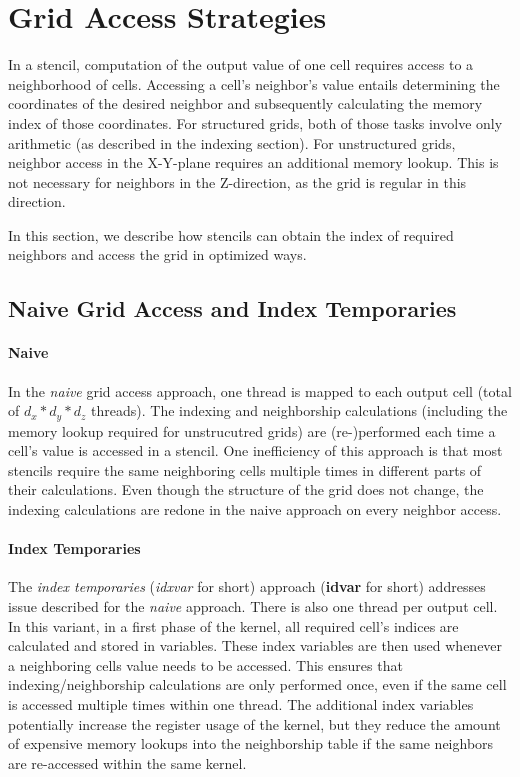 \section{Grid Access Strategies} \label{sec:optimizations}

In a stencil, computation of the output value of one cell requires access to a neighborhood of cells. Accessing a cell's neighbor's value entails determining the coordinates of the desired neighbor and subsequently calculating the memory index of those coordinates. For structured grids, both of those tasks involve only arithmetic (as described in the indexing section). For unstructured grids, neighbor access in the X-Y-plane requires an additional memory lookup. This is not necessary for neighbors in the Z-direction, as the grid is regular in this direction.

In this section, we describe how stencils can obtain the index of required neighbors and access the grid in optimized ways.

\subsection{Naive Grid Access and Index Temporaries}

\paragraph{Naive} In the \emph{naive} grid access approach, one thread is mapped to each output cell (total of $d_x*d_y*d_z$ threads). The indexing and neighborship calculations (including the memory lookup required for unstrucutred grids) are (re-)performed each time a cell's value is accessed in a stencil.  One inefficiency of this approach is that most stencils require the same neighboring cells multiple times in different parts of their calculations. Even though the structure of the grid does not change, the indexing calculations are redone in the naive approach on every neighbor access.

\paragraph{Index Temporaries} The \emph{index temporaries} (\emph{idxvar} for short) approach (\textbf{idvar} for short) addresses issue described for the \emph{naive} approach. There is also one thread per output cell. In this variant, in a first phase of the kernel, all required cell's indices are calculated and stored in variables. These index variables are then used whenever a neighboring cells value needs to be accessed. This ensures that indexing/neighborship calculations are only performed once, even if the same cell is accessed multiple times within one thread. The additional index variables potentially increase the register usage of the kernel, but they reduce the amount of expensive memory lookups into the neighborship table if the same neighbors are re-accessed within the same kernel.

